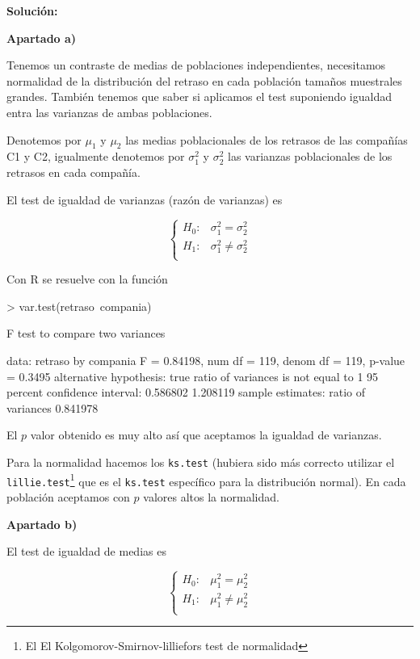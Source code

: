 \documentclass[10pt]{article}
\newif\ifsol
\begin{document}
\ifsol
{\sf
\textbf{Solución:}

\textbf{Apartado a)}

Tenemos un contraste de medias de poblaciones independientes, necesitamos normalidad de la distribución del retraso en cada población tamaños muestrales grandes. También tenemos que saber si aplicamos el test suponiendo igualdad  entra las varianzas de ambas poblaciones.

Denotemos por $\mu_1 $ y $\mu_2$ las medias poblacionales de los retrasos de las compañías C1 y C2,  igualmente denotemos por $\sigma_1^2$ y $\sigma_2^2$ las varianzas poblacionales de los retrasos en cada compañía.

El test de igualdad de varianzas (razón de varianzas) es 

$$\left\{
\begin{array}{ll}
H_0: & \sigma_1^2=\sigma_2^2\\
H_1: & \sigma_1^2\not=\sigma_2^2\\
\end{array}
\right.
$$

Con R se resuelve con la función

\begin{Schunk}
\begin{Sinput}
> var.test(retraso~compania)
\end{Sinput}
\begin{Soutput}
	F test to compare two variances

data:  retraso by compania
F = 0.84198, num df = 119, denom df = 119, p-value = 0.3495
alternative hypothesis: true ratio of variances is not equal to 1
95 percent confidence interval:
 0.586802 1.208119
sample estimates:
ratio of variances 
          0.841978 
\end{Soutput}
\end{Schunk}


El $p$ valor obtenido es muy alto así que aceptamos la igualdad de varianzas.


Para la normalidad hacemos los \texttt{ks.test} (hubiera sido más correcto utilizar el \texttt{lillie.test}\footnote{El El Kolgomorov-Smirnov-lilliefors test de normalidad} que es el \texttt{ks.test} específico para la distribución normal). En cada población aceptamos con $p$ valores altos la normalidad.

\textbf{Apartado b)}

El test de igualdad de medias es 


$$\left\{
\begin{array}{ll}
H_0: & \mu_1^2=\mu_2^2\\
H_1: & \mu_1^2\not=\mu_2^2\\
\end{array}
\right.
$$



}
\end{document}
